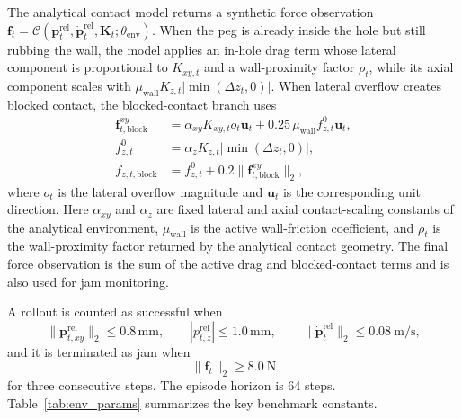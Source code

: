 ﻿\documentclass[11pt]{article}
\newcommand{\mm}{\ensuremath{\mathrm{mm}}}
\newcommand{\N}{\ensuremath{\mathrm{N}}}
\begin{document}
The analytical contact model returns a synthetic force observation
$\mathbf{f}_t = \mathcal{C}(\mathbf{p}^{\mathrm{rel}}_t, \dot{\mathbf{p}}^{\mathrm{rel}}_t,
\mathbf{K}_t; \theta_{\mathrm{env}})$. When the peg is already inside the hole but still rubbing
the wall, the model applies an in-hole drag term whose lateral component is proportional to
$K_{xy,t}$ and a wall-proximity factor $\rho_t$, while its axial component scales with
$\mu_{\mathrm{wall}} K_{z,t} |\min(\Delta z_t, 0)|$. When lateral overflow creates blocked contact,
the blocked-contact branch uses
\begin{align}
\mathbf{f}^{xy}_{t,\mathrm{block}} &=
\alpha_{xy} K_{xy,t} o_t \mathbf{u}_t + 0.25\, \mu_{\mathrm{wall}} f^0_{z,t} \mathbf{u}_t, \\
f^0_{z,t} &= \alpha_z K_{z,t} |\min(\Delta z_t, 0)|, \\
f_{z,t,\mathrm{block}} &= f^0_{z,t} + 0.2 \|\mathbf{f}^{xy}_{t,\mathrm{block}}\|_2,
\end{align}
where $o_t$ is the lateral overflow magnitude and $\mathbf{u}_t$ is the corresponding unit
direction. Here $\alpha_{xy}$ and $\alpha_z$ are fixed lateral and axial contact-scaling
constants of the analytical environment, $\mu_{\mathrm{wall}}$ is the active wall-friction
coefficient, and $\rho_t$ is the wall-proximity factor returned by the analytical contact
geometry. The final force observation is the sum of the active drag and blocked-contact terms and
is also used for jam monitoring.

A rollout is counted as successful when
\begin{equation}
\|\mathbf{p}^{\mathrm{rel}}_{t,xy}\|_2 \le 0.8\,\mm, \qquad
|p^{\mathrm{rel}}_{t,z}| \le 1.0\,\mm, \qquad
\|\dot{\mathbf{p}}^{\mathrm{rel}}_t\|_2 \le 0.08~\mathrm{m/s},
\end{equation}
and it is terminated as jam when
\begin{equation}
\|\mathbf{f}_t\|_2 \ge 8.0~\N
\end{equation}
for three consecutive steps. The episode horizon is 64 steps. Table~\ref{tab:env_params}
summarizes the key benchmark constants.
\end{document}
